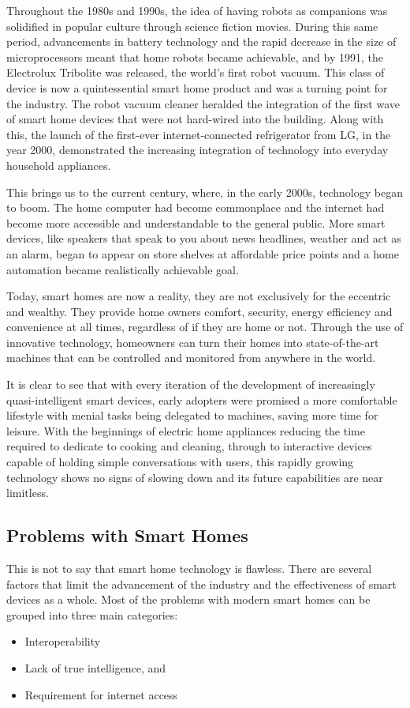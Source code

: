 Throughout the 1980s and 1990s, the idea of having robots as companions was solidified in popular culture through science fiction movies.
During this same period, advancements in battery technology and the rapid decrease in the size of microprocessors meant that home robots became achievable, and by 1991, the Electrolux Tribolite was released, the world's first robot vacuum.
This class of device is now a quintessential smart home product and was a turning point for the industry.
The robot vacuum cleaner heralded the integration of the first wave of smart home devices that were not hard-wired into the building.
Along with this, the launch of the first-ever internet-connected refrigerator from LG, in the year 2000, demonstrated the increasing integration of technology into everyday household appliances.

This brings us to the current century, where, in the early 2000s, technology began to boom.
The home computer had become commonplace and the internet had become more accessible and understandable to the general public.
More smart devices, like speakers that speak to you about news headlines, weather and act as an alarm, began to appear on store shelves at affordable price points and a home automation became realistically achievable goal.

Today, smart homes are now a reality, they are not exclusively for the eccentric and wealthy.
They provide home owners comfort, security, energy efficiency and convenience at all times, regardless of if they are home or not.
Through the use of innovative technology, homeowners can turn their homes into state-of-the-art machines that can be controlled and monitored from anywhere in the world.

It is clear to see that with every iteration of the development of increasingly quasi-intelligent smart devices, early adopters were promised a more comfortable lifestyle with menial tasks being delegated to machines, saving more time for leisure.
With the beginnings of electric home appliances reducing the time required to dedicate to cooking and cleaning, through to interactive devices capable of holding simple conversations with users, this rapidly growing technology shows no signs of slowing down and its future capabilities are near limitless.

\subsection{Problems with Smart Homes}
This is not to say that smart home technology is flawless.
There are several factors that limit the advancement of the industry and the effectiveness of smart devices as a whole.
Most of the problems with modern smart homes can be grouped into three main categories:
\begin{itemize}
    \item Interoperability
    \item Lack of true intelligence, and
    \item Requirement for internet access
\end{itemize}

